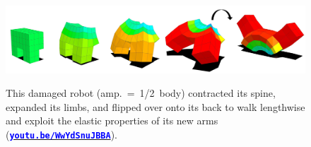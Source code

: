 \begin{figure}[h!]
\begin{center}
\includegraphics[trim={0 0 0 0},clip,width=\linewidth]{Chapter05/fig/Flipper2.jpg}\\
\caption{\label{fig:flipper}
This damaged robot (amp.~=~1/2~body) contracted its spine, expanded its limbs, and flipped over onto its back to walk lengthwise and exploit the elastic properties of its new arms
(\href{https://youtu.be/WwYdSnuJBBA}{\textcolor{blue}{\textbf{\texttt{youtu.be/WwYdSnuJBBA}}}}).
}
\vspace{-1em}
\end{center}
\end{figure}